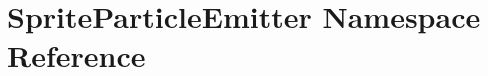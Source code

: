 \hypertarget{namespace_sprite_particle_emitter}{}\section{Sprite\+Particle\+Emitter Namespace Reference}
\label{namespace_sprite_particle_emitter}
